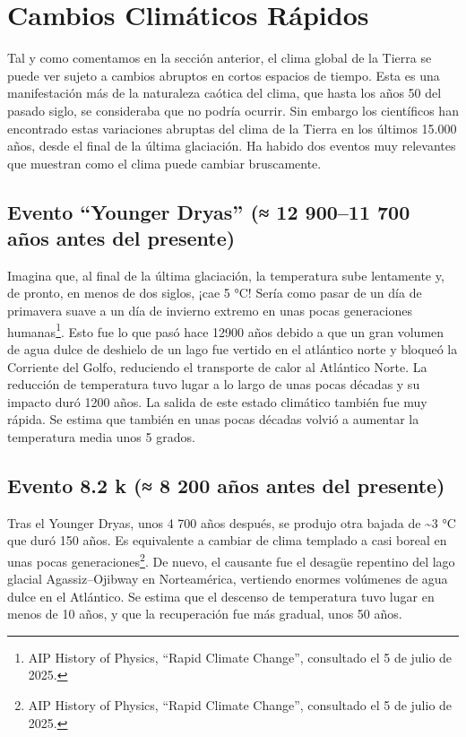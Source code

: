 \documentclass[
  10pt,
  a4paper,
  DIV=11,
  numbers=noendperiod,
  open=any]{scrreprt}
\numberwithin{equation}{chapter}
\numberwithin{equation}{chapter}
\renewcommand{\[}{\begin{equation}}
\renewcommand{\]}{\end{equation}}
\begin{document}

\chapter{Cambios Climáticos
Rápidos}\label{cambios-climuxe1ticos-ruxe1pidos}

Tal y como comentamos en la sección anterior, el clima global de la
Tierra se puede ver sujeto a cambios abruptos en cortos espacios de
tiempo. Esta es una manifestación más de la naturaleza caótica del
clima, que hasta los años 50 del pasado siglo, se consideraba que no
podría ocurrir. Sin embargo los científicos han encontrado estas
variaciones abruptas del clima de la Tierra en los últimos 15.000 años,
desde el final de la última glaciación. Ha habido dos eventos muy
relevantes que muestran como el clima puede cambiar bruscamente.

\section{Evento ``Younger Dryas'' (≈ 12 900--11 700 años antes del
presente)}\label{evento-younger-dryas-12-90011-700-auxf1os-antes-del-presente}

Imagina que, al final de la última glaciación, la temperatura sube
lentamente y, de pronto, en menos de dos siglos, ¡cae 5 °C! Sería como
pasar de un día de primavera suave a un día de invierno extremo en unas
pocas generaciones humanas\footnote{AIP History of Physics, ``Rapid
  Climate Change'', consultado el 5 de julio de 2025.}. Esto fue lo que
pasó hace 12900 años debido a que un gran volumen de agua dulce de
deshielo de un lago fue vertido en el atlántico norte y bloqueó la
Corriente del Golfo, reduciendo el transporte de calor al Atlántico
Norte. La reducción de temperatura tuvo lugar a lo largo de unas pocas
décadas y su impacto duró 1200 años. La salida de este estado climático
también fue muy rápida. Se estima que también en unas pocas décadas
volvió a aumentar la temperatura media unos 5 grados.

\section{Evento 8.2 k (≈ 8 200 años antes del
presente)}\label{evento-8.2-k-8-200-auxf1os-antes-del-presente}

Tras el Younger Dryas, unos 4 700 años después, se produjo otra bajada
de \textasciitilde3 °C que duró 150 años. Es equivalente a cambiar de
clima templado a casi boreal en unas pocas generaciones\footnote{AIP
  History of Physics, ``Rapid Climate Change'', consultado el 5 de julio
  de 2025.}. De nuevo, el causante fue el desagüe repentino del lago
glacial Agassiz--Ojibway en Norteamérica, vertiendo enormes volúmenes de
agua dulce en el Atlántico. Se estima que el descenso de temperatura
tuvo lugar en menos de 10 años, y que la recuperación fue más gradual,
unos 50 años.
\end{document}
